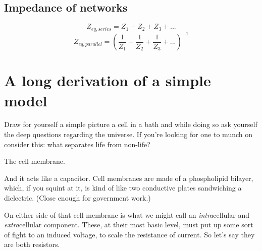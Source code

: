 \documentclass[11pt]{book}
\begin{document}
\subsection{Impedance of networks}
\begin{equation}
	Z_{eq,series} = Z_1 + Z_2 + Z_3 + ...
\end{equation}
\begin{equation}
	Z_{eq,parallel} = \left(\frac{1}{Z_1}+ \frac{1}{Z_2}+ \frac{1}{Z_3} + ...\right)^{-1}
\end{equation}

\section{A long derivation of a simple model}

Draw for yourself a simple picture a cell in a bath and while doing so ask yourself the deep questions regarding the universe. If you're looking for one to munch on consider this: what separates life from non-life?

The cell membrane.

And it acts like a capacitor. Cell membranes are made of a phospholipid bilayer, which, if you squint at it, is kind of like two conductive plates sandwiching a dielectric. (Close enough for government work.) 

On either side of that cell membrane is what we might call an \textit{intra}cellular and \textit{extra}cellular component. These, at their most basic level, must put up some sort of fight to an induced voltage, to scale the resistance of current. So let's say they are both resistors.
\end{document}
